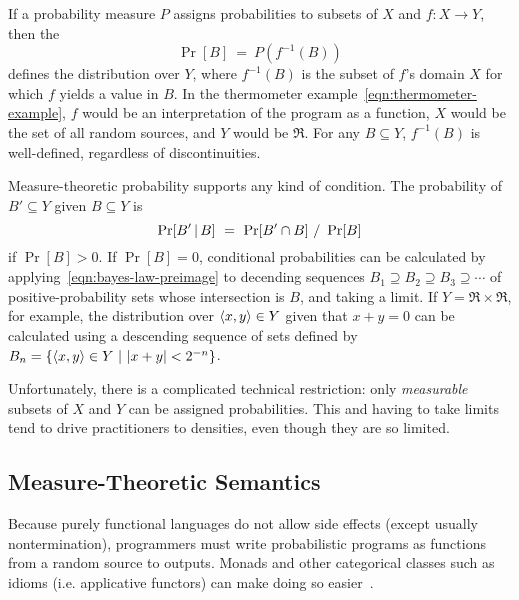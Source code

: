 \documentclass{llncs}
\begin{document}
If a probability measure $P$ assigns probabilities to subsets of $X$ and $f : X \to Y$, then the 
\begin{equation}
	\Pr[B] \ = \ P(f^{-1}(B))
\end{equation}
defines the distribution over $Y$, where $f^{-1}(B)$ is the subset of $f$'s domain $X$ for which $f$ yields a value in $B$.
In the thermometer example~\eqref{eqn:thermometer-example}, $f$ would be an interpretation of the program as a function, $X$ would be the set of all random sources, and $Y$ would be $\Re$.
For any $B \subseteq Y$, $f^{-1}(B)$ is well-defined, regardless of discontinuities.

Measure-theoretic probability supports any kind of condition.
The probability of $B' \subseteq Y$ given $B \subseteq Y$ is
\begin{equation}
	\Pr[B'\,|\,B]\ =\ \Pr[B' \i B]\ /\ \Pr[B]
\label{eqn:bayes-law-preimage}
\end{equation}
if $\Pr[B] > \mathrm{0}$.
If $\Pr[B] = \mathrm{0}$, conditional probabilities can be calculated by applying~\eqref{eqn:bayes-law-preimage} to decending sequences $B_1 \supseteq B_2 \supseteq B_3 \supseteq \cdots$ of positive-probability sets whose intersection is $B$, and taking a limit.
If $Y = \Re \times \Re$, for example, the distribution over $\langle{x,y}\rangle \in Y$ given that $x + y = \mathrm{0}$ can be calculated using a descending sequence of sets defined by $B_n = \lbrace {\langle{x,y}\rangle \in Y} \ \lvert\ {|x + y| < \mathrm{2}^{-n}} \rbrace$.

Unfortunately, there is a complicated technical restriction: only \emph{measurable} subsets of $X$ and $Y$ can be assigned probabilities.
This and having to take limits tend to drive practitioners to densities, even though they are so limited.

\subsection{Measure-Theoretic Semantics}

Because purely functional languages do not allow side effects (except usually nontermination), programmers must write probabilistic programs as functions from a random source to outputs.
Monads and other categorical classes such as idioms (i.e. applicative functors) can make doing so easier~\cite{cit:hurd-2002thesis,cit:toronto-2010ifl-bayes}.
\end{document}
